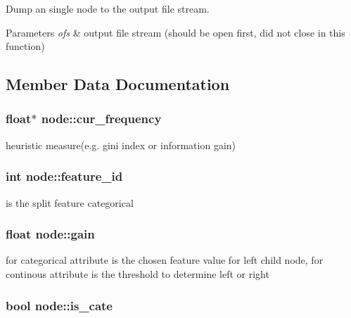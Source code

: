 Dump an single node to the output file stream. 


\begin{DoxyParams}{Parameters}
{\em ofs} & output file stream (should be open first, did not close in this function) \\
\hline
\end{DoxyParams}


\subsection{Member Data Documentation}
\hypertarget{classnode_ae4125b554711d8ad9d6726ffd69e0b77}{
\subsubsection[{cur\+\_\+frequency}]{\setlength{\rightskip}{0pt plus 5cm}float$\ast$ node\+::cur\+\_\+frequency}}\label{classnode_ae4125b554711d8ad9d6726ffd69e0b77}
heuristic measure(e.\+g. gini index or information gain) \hypertarget{classnode_ad65aefa2c967c82cd88e6870085d7f3e}{
\subsubsection[{feature\+\_\+id}]{\setlength{\rightskip}{0pt plus 5cm}int node\+::feature\+\_\+id}}\label{classnode_ad65aefa2c967c82cd88e6870085d7f3e}
is the split feature categorical \hypertarget{classnode_a7154054210920a77711f8ddb0cf45941}{
\subsubsection[{gain}]{\setlength{\rightskip}{0pt plus 5cm}float node\+::gain}}\label{classnode_a7154054210920a77711f8ddb0cf45941}
for categorical attribute is the chosen feature value for left child node, for continous attribute is the threshold to determine left or right \hypertarget{classnode_a67c3c0be5001ace8494a6292e8079001}{
\subsubsection[{is\+\_\+cate}]{\setlength{\rightskip}{0pt plus 5cm}bool node\+::is\+\_\+cate}}\label{classnode_a67c3c0be5001ace8494a6292e8079001}
